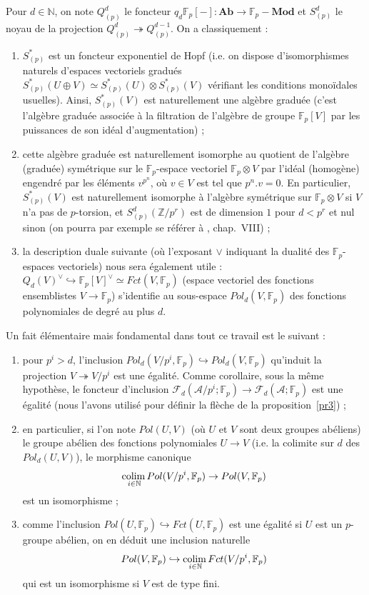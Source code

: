 \documentclass[a4paper,10pt]{article}
\newcommand{\A}{{\mathcal{A}}}
\newcommand{\F}{{\mathcal{F}}}
\newcommand{\col}{{\rm colim}\,}
\theoremstyle{definition}
\theoremstyle{remark}
\begin{document}
Pour $d\in\mathbb{N}$, on note $Q^d_{(p)}$ le foncteur $q_d\mathbb{F}_p[-] : \mathbf{Ab}\to\mathbb{F}_p-\mathbf{Mod}$ et $S^d_{(p)}$ le noyau de la projection $Q^d_{(p)}\twoheadrightarrow Q^{d-1}_{(p)}$. On a classiquement :
\begin{enumerate}
 \item $S^*_{(p)}$ est un foncteur exponentiel de Hopf (i.e. on dispose d'isomorphismes naturels d'espaces vectoriels gradués $S^*_{(p)}(U\oplus V)\simeq S^*_{(p)}(U)\otimes S^*_{(p)}(V)$ vérifiant les conditions monoïdales usuelles). Ainsi, $S^*_{(p)}(V)$ est naturellement une algèbre graduée (c'est l'algèbre graduée associée à la filtration de l'algèbre de groupe $\mathbb{F}_p[V]$ par les puissances de son idéal d'augmentation) ;
\item cette algèbre graduée est naturellement isomorphe au quotient de l'algèbre (graduée) symétrique sur le $\mathbb{F}_p$-espace vectoriel $\mathbb{F}_p\otimes V$ par l'idéal (homogène) engendré par les éléments $v^{p^n}$, où $v\in V$ est tel que $p^n.v=0$. En particulier, $S^*_{(p)}(V)$ est naturellement isomorphe à l'algèbre symétrique sur $\mathbb{F}_p\otimes V$ si $V$ n'a pas de $p$-torsion, et $S^d_{(p)}(\mathbb{Z}/p^r)$ est de dimension $1$ pour $d<p^r$ et nul sinon (on pourra par exemple se référer à \cite{Passi}, chap.~VIII) ;
\item la description duale suivante (où l'exposant $\vee$ indiquant la dualité des $\mathbb{F}_p$-espaces vectoriels) nous sera également utile : $Q_d(V)^\vee\hookrightarrow\mathbb{F}_p[V]^\vee\simeq Fct(V,\mathbb{F}_p)$ (espace vectoriel des fonctions ensemblistes $V\to\mathbb{F}_p$) s'identifie au sous-espace $Pol_d(V,\mathbb{F}_p)$ des fonctions polynomiales de degré au plus $d$.
\end{enumerate}

Un fait élémentaire mais fondamental dans tout ce travail est le suivant :
\begin{enumerate}
 \item pour $p^i>d$, l'inclusion $Pol_d(V/p^i,\mathbb{F}_p)\hookrightarrow Pol_d(V,\mathbb{F}_p)$ qu'induit la projection $V\twoheadrightarrow V/p^i$ est une égalité. Comme corollaire, sous la même hypothèse, le foncteur d'inclusion $\F_d(\A/p^i;\mathbb{F}_p)\to\F_d(\A;\mathbb{F}_p)$ est une égalité (nous l'avons utilisé pour définir la flèche de la proposition~\ref{pr3}) ;
\item en particulier, si l'on note $Pol(U,V)$ (où $U$ et $V$ sont deux groupes abéliens) le groupe abélien des fonctions polynomiales $U\to V$ (i.e. la colimite sur $d$ des $Pol_d(U,V)$), le morphisme canonique
$$\underset{i\in\mathbb{N}}{\col} Pol(V/p^i,\mathbb{F}_p)\to Pol(V,\mathbb{F}_p)$$
est un isomorphisme ;
\item comme l'inclusion $Pol(U,\mathbb{F}_p)\hookrightarrow Fct(U,\mathbb{F}_p)$ est une égalité si $U$ est un $p$-groupe abélien, on en déduit une inclusion naturelle
\begin{equation}\label{eqp}
Pol(V,\mathbb{F}_p)\hookrightarrow\underset{i\in\mathbb{N}}{\col} Fct(V/p^i,\mathbb{F}_p)
\end{equation}
qui est un isomorphisme si $V$ est de type fini.
\end{enumerate}
\end{document}

